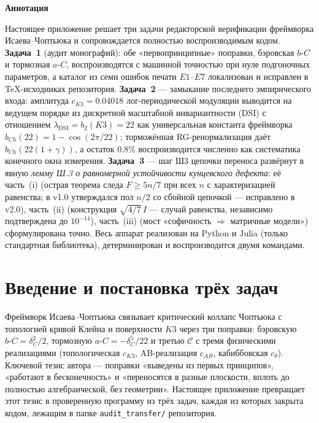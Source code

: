 \documentclass[11pt,a4paper]{article}
\theoremstyle{plain}
\theoremstyle{definition}
\theoremstyle{remark}
\begin{document}

\tableofcontents
\newpage

\begin{center}
{\Large\bfseries Аннотация}\par\medskip
\end{center}
\noindent
Настоящее приложение решает три задачи редакторской верификации фреймворка
Исаева--Чоптьюка и сопровождается полностью воспроизводимым кодом.
\textbf{Задача~1} (аудит монографий): обе «первопринципные» поправки,
бэровская $b\text{-}C$ и тормозная $a\text{-}C$, воспроизводятся с машинной
точностью при нуле подгоночных параметров, а каталог из семи ошибок печати
$E1$--$E7$ локализован и исправлен в \TeX-исходниках репозитория. \textbf{Задача~2} --- замыкание последнего эмпирического входа:
амплитуда $c_{K3}=0.04018$ лог-периодической модуляции выводится на ведущем
порядке из дискретной масштабной инвариантности (DSI) с отношением
$\lambda_{\mathrm{DSI}}=b_2(K3)=22$ как универсальная константа фреймворка
$b_{Ch}(22)=1-\cos(2\pi/22)$; торможённая RG-ренормализация даёт
$b_{Ch}(22(1+\gamma))$, а остаток $0.8\%$ воспроизводится численно как
систематика конечного окна измерения. \textbf{Задача~3} --- шаг Ш3 цепочки
переноса развёрнут в явную \emph{лемму Ш.3 о равномерной устойчивости
кунцевского дефекта}: её часть~(i) (острая теорема следа $F\ge 5n/7$ при всех $n$
с характеризацией равенства; в v1.0 утверждался пол $n/2$ со сбойной цепочкой —
исправлено в v2.0), часть~(ii) (конструкция $\sqrt{4/7}\,I$ — случай равенства,
независимо подтверждена до $10^{-14}$), часть~(iii)
(мост «софичность $\Rightarrow$ матричные модели») сформулирована точно.
Весь аппарат реализован на Python и Julia (только стандартная библиотека),
детерминирован и воспроизводится двумя командами.

\section{Введение и постановка трёх задач}\label{sec:intro}

Фреймворк Исаева--Чоптьюка связывает критический коллапс Чоптьюка с топологией
кривой Клейна и поверхности $K3$ через три поправки: бэровскую
$b\text{-}C=\delta_C^2/2$, тормозную $a\text{-}C=-\delta_C^5/22$ и третью
$\mathcal C$ с тремя физическими реализациями (топологическая $c_{K3}$,
AB-реализация $c_{AB}$, кабиббовская $c_\theta$). Ключевой тезис автора ---
поправки «выведены из первых принципов», «работают в бесконечность» и
«переносятся в разные плоскости, вплоть до полностью алгебраической, без
геометрии». Настоящее приложение превращает этот тезис в проверенную
программу из трёх задач, каждая из которых закрыта кодом, лежащим в папке
\texttt{audit\_transfer/} репозитория.
\end{document}
